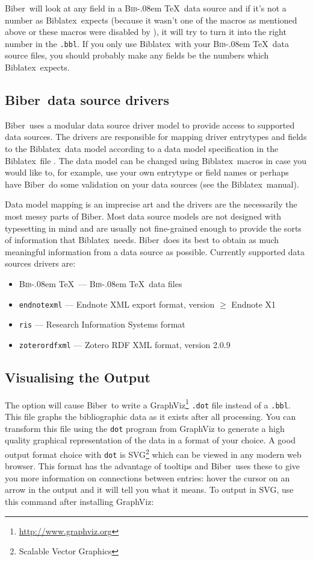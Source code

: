 \documentclass{ltxdockit}
\def\BibTeX{\textsc{Bib}\kern-.08em \TeX}
\newcommand*{\biber}{Biber\xspace}
\newcommand*{\biblatex}{Biblatex\xspace}
\begin{document}
\biber\ will look at any  field in a \BibTeX\ data
source and if it's not a number as \biblatex\ expects (because it
wasn't one of the macros as mentioned above or these macros were disabled
by ), it will try to turn it into the right number in
the \verb+.bbl+. If you only use \biblatex\ with your \BibTeX\
data source files, you should probably make any  fields be the
numbers which \biblatex\ expects.

\subsection{\biber\ data source drivers}\label{dsd}

\biber\ uses a modular data source driver model to provide access
to supported data sources. The drivers are responsible for mapping
driver entrytypes and fields to the \biblatex\ data model according to a
data model specification in the \biblatex\ file \file{blx-dm.def}. The
data model can be changed using \biblatex\ macros in case you would
like to, for example, use your own entrytype or field names or perhaps
have \biber\ do some validation on your data sources (see the \biblatex\
manual). 

Data model mapping is an imprecise art and the drivers are the
necessarily the most messy parts of \biber. Most data source models are
not designed with typesetting in mind and are usually not fine-grained
enough to provide the sorts of information that \biblatex\
needs. \biber\ does its best to obtain as much meaningful information
from a data source as possible. Currently supported data sources
drivers are:

\begin{itemize}
\item \BibTeX\ --- \BibTeX\ data files
\item \verb+endnotexml+ --- Endnote XML export format, version $\geq$ Endnote X1
\item \verb+ris+ --- Research Information Systems format
\item \verb+zoterordfxml+ --- Zotero RDF XML format, version 2.0.9
\end{itemize}

\subsection{Visualising the Output}\label{vis}

The option  will cause \biber\ to write a
GraphViz\footnote{\url{http://www.graphviz.org}} \verb+.dot+ file instead
of a \verb+.bbl+. This file graphs the bibliographic data as it exists
after all processing. You can transform this file using the \verb+dot+
program from GraphViz to generate a high quality graphical representation
of the data in a format of your choice. A good output format choice with
\verb+dot+ is SVG\footnote{Scalable Vector Graphics} which can be viewed in
any modern web browser. This format has the advantage of tooltips and \biber\
uses these to give you more information on connections between entries:
hover the cursor on an arrow in the output and it will tell you what it
means. To output in SVG, use this command after installing GraphViz:
\end{document}
